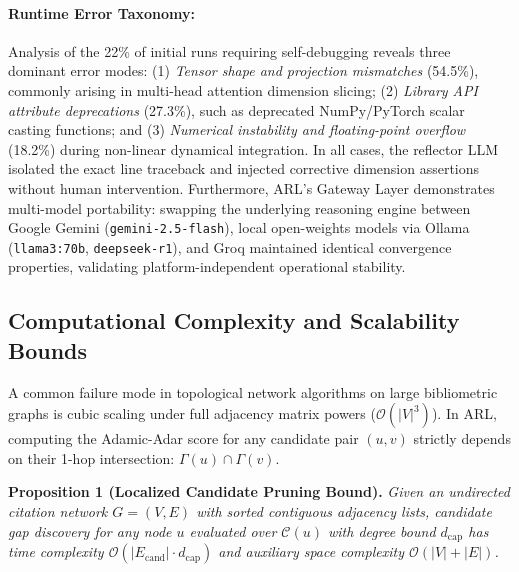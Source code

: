 \documentclass[10pt,twocolumn,letterpaper]{article}
\begin{document}
\paragraph{Runtime Error Taxonomy:}
Analysis of the 22\% of initial runs requiring self-debugging reveals three dominant error modes:
(1) \textit{Tensor shape and projection mismatches} (54.5\%), commonly arising in multi-head attention dimension slicing;
(2) \textit{Library API attribute deprecations} (27.3\%), such as deprecated NumPy/PyTorch scalar casting functions; and
(3) \textit{Numerical instability and floating-point overflow} (18.2\%) during non-linear dynamical integration.
In all cases, the reflector LLM isolated the exact line traceback and injected corrective dimension assertions without human intervention. Furthermore, ARL's Gateway Layer demonstrates multi-model portability: swapping the underlying reasoning engine between Google Gemini (\texttt{gemini-2.5-flash}), local open-weights models via Ollama (\texttt{llama3:70b}, \texttt{deepseek-r1}), and Groq maintained identical convergence properties, validating platform-independent operational stability.

\subsection{Computational Complexity and Scalability Bounds}
A common failure mode in topological network algorithms on large bibliometric graphs is cubic scaling under full adjacency matrix powers ($\mathcal{O}(|V|^3)$). In ARL, computing the Adamic-Adar score for any candidate pair $(u, v)$ strictly depends on their 1-hop intersection: $\Gamma(u) \cap \Gamma(v)$. 

\noindent\textbf{Proposition 1 (Localized Candidate Pruning Bound).} \textit{Given an undirected citation network $G = (V, E)$ with sorted contiguous adjacency lists, candidate gap discovery for any node $u$ evaluated over $\mathcal{C}(u)$ with degree bound $d_{\text{cap}}$ has time complexity $\mathcal{O}(|E_{\text{cand}}| \cdot d_{\text{cap}})$ and auxiliary space complexity $\mathcal{O}(|V| + |E|)$.}
\end{document}
